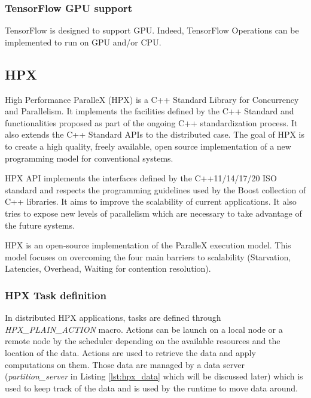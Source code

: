 \subsubsection{TensorFlow GPU support}
TensorFlow is designed to support GPU.
Indeed, TensorFlow Operations can be implemented to run on GPU and/or CPU.





\subsection{HPX}
High Performance ParalleX (HPX) \cite{KHASF2014} \cite{KAHBS2019} is a C++ Standard Library for Concurrency and Parallelism.
It implements the facilities defined by the C++ Standard and functionalities proposed as part of the ongoing C++ standardization process.
It also extends the C++ Standard APIs to the distributed case.
The goal of HPX is to create a high quality, freely available, open source implementation of a new programming model for conventional systems.

HPX API implements the interfaces defined by the C++11/14/17/20 ISO standard and respects the programming guidelines used by the Boost collection of C++ libraries.
It aims to improve the scalability of current applications.
It also tries to expose new levels of parallelism which are necessary to take advantage of the future systems.

HPX is an open-source implementation of the ParalleX execution model.
This model focuses on overcoming the four main barriers to scalability (Starvation, Latencies, Overhead, Waiting for contention resolution).




\subsubsection{HPX Task definition}
In distributed HPX applications, tasks are defined through \textit{HPX\_PLAIN\_ACTION} macro.
Actions can be launch on a local node or a remote node by the scheduler depending on the available resources and the location of the data.
Actions are used to retrieve the data and apply computations on them.
Those data are managed by a data server (\textit{partition\_server} in Listing \ref{lst:hpx_data} which will be discussed later) which is used to keep track of the data and is used by the runtime to move data around.

